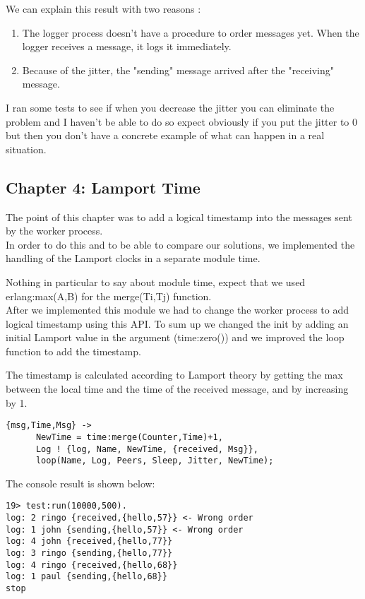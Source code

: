 \documentclass[a4paper, 11pt]{article}
\begin{document}
We can explain this result with two reasons :
\begin{enumerate}
\item The logger process doesn't have a procedure to order messages yet. When the logger receives a message, it logs it immediately.
\item Because of the jitter, the "sending" message arrived after the "receiving" message.
\end{enumerate}

I ran some tests to see if when you decrease the jitter you can eliminate the problem and I haven't be able to do so expect obviously if you put the jitter to 0 but then you don't have a concrete example of what can happen in a real situation.

\subsection{Chapter 4: Lamport Time}
The point of this chapter was to add a logical timestamp into the messages sent by the worker process. \\
In order to do this and to be able to compare our solutions, we implemented the handling of the Lamport clocks in a separate module time.

Nothing in particular to say about module time, expect that we used erlang:max(A,B) for the merge(Ti,Tj) function. \\

After we implemented this module we had to change the worker process to add logical timestamp using this API. To sum up we changed the init by adding an initial Lamport value in the argument (time:zero()) and we improved the loop function to add the timestamp.

The timestamp is calculated according to Lamport theory by getting the max between the local time and the time of the received message, and by increasing by 1.

\begin{verbatim}
{msg,Time,Msg} ->
      NewTime = time:merge(Counter,Time)+1,
      Log ! {log, Name, NewTime, {received, Msg}},
      loop(Name, Log, Peers, Sleep, Jitter, NewTime);
\end{verbatim}
The console result is shown below:
\begin{lstlisting}
19> test:run(10000,500).
log: 2 ringo {received,{hello,57}} <- Wrong order
log: 1 john {sending,{hello,57}} <- Wrong order
log: 4 john {received,{hello,77}}
log: 3 ringo {sending,{hello,77}}
log: 4 ringo {received,{hello,68}}
log: 1 paul {sending,{hello,68}}
stop
\end{lstlisting}
\end{document}
